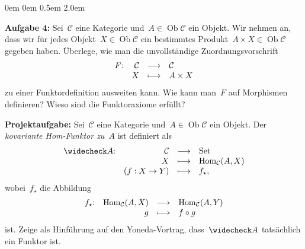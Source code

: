 \documentclass[a4paper,ngerman]{scrartcl}
\theoremstyle{definition}
\theoremstyle{plain}
\theoremstyle{remark}
\newcommand{\C}{\mathcal{C}}
\newcommand{\Hom}{\mathrm{Hom}}
\newcommand{\Set}{\mathrm{Set}}
\DeclareMathOperator{\Ob}{Ob}
\begin{document}
\begin{list}{}{0em \leftmargin0em \itemindent0.5em \itemsep 2.0em}
\item[\textbf{Aufgabe 4:}]
Sei~$\C$ eine Kategorie und~$A \in \Ob \C$ ein Objekt. Wir nehmen an, dass wir
für jedes Objekt~$X \in \Ob \C$ ein bestimmtes Produkt~$A \times X \in \Ob \C$
gegeben haben. Überlege, wie man die unvollständige Zuordnungsvorschrift
\[ \begin{array}{@{}rrcl@{}}
  F{:} & \C &\longrightarrow& \C \\
  & X &\longmapsto& A \times X
\end{array} \]
zu einer Funktordefinition ausweiten kann. Wie kann man~$F$ auf Morphismen
definieren? Wieso sind die Funktoraxiome erfüllt?

\small
\item[\textbf{Projektaufgabe:}]
Sei~$\C$ eine Kategorie und~$A \in \Ob \C$ ein Objekt. Der \emph{kovariante
Hom-Funktor zu~$A$} ist definiert als
\[ \begin{array}{@{}rrcl@{}}
  \widecheck A{:} & \C &\longrightarrow& \Set \\
  & X &\longmapsto& \Hom_\C(A,X) \\
  & (f: X \to Y) &\longmapsto& f_\star,
\end{array} \]
wobei~$f_\star$ die Abbildung
\[ \begin{array}{@{}rrcl@{}}
  f_\star{:} & \Hom_\C(A,X) &\longrightarrow& \Hom_\C(A,Y) \\
  & g &\longmapsto& f \circ g
\end{array} \]
ist. Zeige als Hinführung auf den Yoneda-Vortrag, dass~$\widecheck A$ tatsächlich
ein Funktor ist.
\end{list}
\end{document}
